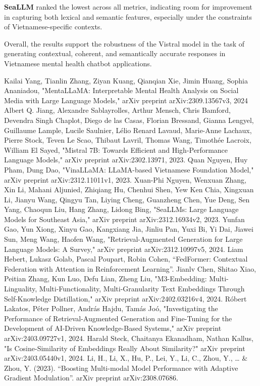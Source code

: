 \documentclass[conference]{IEEEtran}
\begin{document}
\textbf{SeaLLM} ranked the lowest across all metrics, indicating room for improvement in capturing both lexical and semantic features, especially under the constraints of Vietnamese-specific contexts.

Overall, the results support the robustness of the Vistral model in the task of generating contextual, coherent, and semantically accurate responses in Vietnamese mental health chatbot applications.



\begin{thebibliography}{9}
     Kailai Yang, Tianlin Zhang, Ziyan Kuang, Qianqian Xie, Jimin Huang, Sophia Ananiadou, "MentaLLaMA: Interpretable Mental Health Analysis on Social Media with Large Language Models," arXiv preprint arXiv:2309.13567v3, 2024
     Albert Q. Jiang, Alexandre Sablayrolles, Arthur Mensch, Chris Bamford, Devendra Singh Chaplot, Diego de las Casas, Florian Bressand, Gianna Lengyel, Guillaume Lample, Lucile Saulnier, Lélio Renard Lavaud, Marie-Anne Lachaux, Pierre Stock, Teven Le Scao, Thibaut Lavril, Thomas Wang, Timothée Lacroix, William El Sayed, "Mistral 7B: Towards Efficient and High-Performance Language Models," arXiv preprint arXiv:2302.13971, 2023.
     Quan Nguyen, Huy Pham, Dung Dao, "VinaLLaMA: LLaMA-based Vietnamese Foundation Model," arXiv preprint arXiv:2312.11011v1, 2023.
     Xuan-Phi Nguyen, Wenxuan Zhang, Xin Li, Mahani Aljunied, Zhiqiang Hu, Chenhui Shen, Yew Ken Chia, Xingxuan Li, Jianyu Wang, Qingyu Tan, Liying Cheng, Guanzheng Chen, Yue Deng, Sen Yang, Chaoqun Liu, Hang Zhang, Lidong Bing, "SeaLLMs: Large Language Models for Southeast Asia," arXiv preprint arXiv:2312.16934v2, 2023.
     Yunfan Gao, Yun Xiong, Xinyu Gao, Kangxiang Jia, Jinliu Pan, Yuxi Bi, Yi Dai, Jiawei Sun, Meng Wang, Haofen Wang, "Retrieval-Augmented Generation for Large Language Models: A Survey," arXiv preprint arXiv:2312.10997v5, 2024.
     Liam Hebert, Lukasz Golab, Pascal Poupart, Robin Cohen, ``FedFormer: Contextual Federation with Attention in Reinforcement Learning''.
     Jianlv Chen, Shitao Xiao, Peitian Zhang, Kun Luo, Defu Lian, Zheng Liu, "M3-Embedding: Multi-Linguality, Multi-Functionality, Multi-Granularity Text Embeddings Through Self-Knowledge Distillation," arXiv preprint arXiv:2402.03216v4, 2024.
     Róbert Lakatos, Péter Pollner, András Hajdu, Tamás Joó, "Investigating the Performance of Retrieval-Augmented Generation and Fine-Tuning for the Development of AI-Driven Knowledge-Based Systems," arXiv preprint arXiv:2403.09727v1, 2024.
     Harald Steck, Chaitanya Ekanadham, Nathan Kallus, "Is Cosine-Similarity of Embeddings Really About Similarity?" arXiv preprint arXiv:2403.05440v1, 2024.
     Li, H., Li, X., Hu, P., Lei, Y., Li, C., Zhou, Y., … \& Zhou, Y. (2023). ``Boosting Multi-modal Model Performance with Adaptive Gradient Modulation''. arXiv preprint arXiv:2308.07686.
\end{thebibliography}
\end{document}
